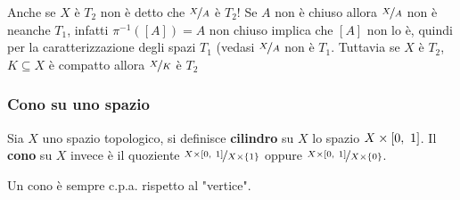 \begin{attention}
	Anche se $X$ è $T_2$ non è detto che $\nicefrac{X}{A}$ è $T_2$!\newline
	Se $A$ non è chiuso allora $\nicefrac{X}{A}$ non è neanche $T_1$, infatti $\pi^{-1}([A])=A$ non chiuso implica che $[A]$ non lo è, quindi per la caratterizzazione degli spazi $T_1$ (vedasi %
	$\nicefrac{X}{A}$ non è $T_1$.\newline 
	Tuttavia se $X$ è $T_2$, $K\subseteq X$ è compatto allora $\nicefrac{X}{K}$ è $T_2$
\end{attention}

\subsubsection{Cono su uno spazio}
\begin{define}
	Sia $X$ uno spazio topologico, si definisce \textbf{cilindro} su $X$ lo spazio $X\times \left[0,\ 1\right]$.\newline 
	Il \textbf{cono} su $X$ invece è il quoziente $\displaystyle \nicefrac{X\times\left[0,\ 1\right]}{X\times\{1\}}$ oppure $\displaystyle \nicefrac{X\times\left[0,\ 1\right]}{X\times\{0\}}$.
\end{define}

\begin{observe}
	Un cono è sempre c.p.a. rispetto al "vertice".
\end{observe}